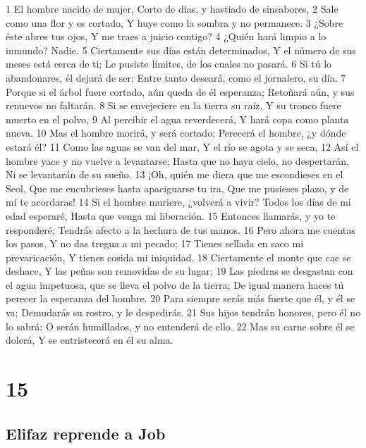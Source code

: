 1 El hombre nacido de mujer,
Corto de días, y hastiado de sinsabores,
2 Sale como una flor y es cortado,
Y huye como la sombra y no permanece.
3 ¿Sobre éste abres tus ojos,
Y me traes a juicio contigo?
4 ¿Quién hará limpio a lo inmundo?
Nadie.
5 Ciertamente sus días están determinados,
Y el número de sus meses está cerca de ti;
Le pusiste límites, de los cuales no pasará.
6 Si tú lo abandonares, él dejará de ser;
Entre tanto deseará, como el jornalero, su día.
7 Porque si el árbol fuere cortado, aún queda de él esperanza;
Retoñará aún, y sus renuevos no faltarán.
8 Si se envejeciere en la tierra su raíz,
Y su tronco fuere muerto en el polvo,
9 Al percibir el agua reverdecerá,
Y hará copa como planta nueva.
10 Mas el hombre morirá, y será cortado;
Perecerá el hombre, ¿y dónde estará él?
11 Como las aguas se van del mar,
Y el río se agota y se seca,
12 Así el hombre yace y no vuelve a levantarse;
Hasta que no haya cielo, no despertarán,
Ni se levantarán de su sueño.
13 ¡Oh, quién me diera que me escondieses en el Seol,
Que me encubrieses hasta apaciguarse tu ira,
Que me pusieses plazo, y de mí te acordaras!
14 Si el hombre muriere, ¿volverá a vivir?
Todos los días de mi edad esperaré,
Hasta que venga mi liberación.
15 Entonces llamarás, y yo te responderé;
Tendrás afecto a la hechura de tus manos.
16 Pero ahora me cuentas los pasos,
Y no das tregua a mi pecado;
17 Tienes sellada en saco mi prevaricación,
Y tienes cosida mi iniquidad.
18 Ciertamente el monte que cae se deshace,
Y las peñas son removidas de su lugar;
19 Las piedras se desgastan con el agua impetuosa, que se lleva el polvo de la tierra;
De igual manera haces tú perecer la esperanza del hombre.
20 Para siempre serás más fuerte que él, y él se va;
Demudarás su rostro, y le despedirás. 
21 Sus hijos tendrán honores, pero él no lo sabrá;
O serán humillados, y no entenderá de ello.
22 Mas su carne sobre él se dolerá,
Y se entristecerá en él su alma. 

\chapter{15}

\section*{Elifaz reprende a Job}

